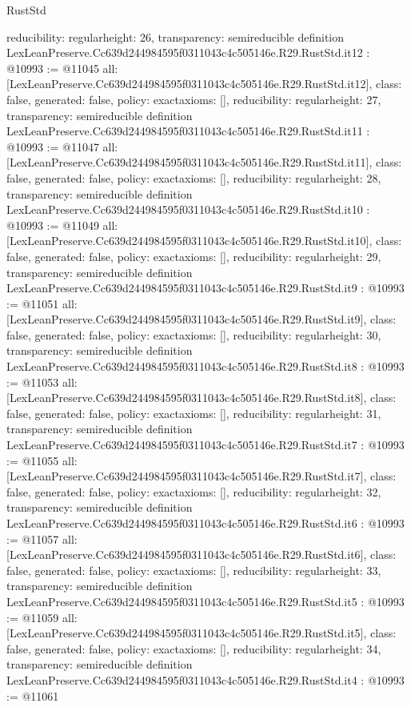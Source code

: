 \begin{lexlean}{RustStd}
\begin{coremodule}
{  reducibility: regular{height: 26},
  transparency: semireducible
}
definition LexLeanPreserve.Cc639d244984595f0311043c4c505146e.R29.RustStd.it12 : @10993 := @11045 {
  all: [LexLeanPreserve.Cc639d244984595f0311043c4c505146e.R29.RustStd.it12],
  class: false,
  generated: false,
  policy: exact{axioms: []},
  reducibility: regular{height: 27},
  transparency: semireducible
}
definition LexLeanPreserve.Cc639d244984595f0311043c4c505146e.R29.RustStd.it11 : @10993 := @11047 {
  all: [LexLeanPreserve.Cc639d244984595f0311043c4c505146e.R29.RustStd.it11],
  class: false,
  generated: false,
  policy: exact{axioms: []},
  reducibility: regular{height: 28},
  transparency: semireducible
}
definition LexLeanPreserve.Cc639d244984595f0311043c4c505146e.R29.RustStd.it10 : @10993 := @11049 {
  all: [LexLeanPreserve.Cc639d244984595f0311043c4c505146e.R29.RustStd.it10],
  class: false,
  generated: false,
  policy: exact{axioms: []},
  reducibility: regular{height: 29},
  transparency: semireducible
}
definition LexLeanPreserve.Cc639d244984595f0311043c4c505146e.R29.RustStd.it9 : @10993 := @11051 {
  all: [LexLeanPreserve.Cc639d244984595f0311043c4c505146e.R29.RustStd.it9],
  class: false,
  generated: false,
  policy: exact{axioms: []},
  reducibility: regular{height: 30},
  transparency: semireducible
}
definition LexLeanPreserve.Cc639d244984595f0311043c4c505146e.R29.RustStd.it8 : @10993 := @11053 {
  all: [LexLeanPreserve.Cc639d244984595f0311043c4c505146e.R29.RustStd.it8],
  class: false,
  generated: false,
  policy: exact{axioms: []},
  reducibility: regular{height: 31},
  transparency: semireducible
}
definition LexLeanPreserve.Cc639d244984595f0311043c4c505146e.R29.RustStd.it7 : @10993 := @11055 {
  all: [LexLeanPreserve.Cc639d244984595f0311043c4c505146e.R29.RustStd.it7],
  class: false,
  generated: false,
  policy: exact{axioms: []},
  reducibility: regular{height: 32},
  transparency: semireducible
}
definition LexLeanPreserve.Cc639d244984595f0311043c4c505146e.R29.RustStd.it6 : @10993 := @11057 {
  all: [LexLeanPreserve.Cc639d244984595f0311043c4c505146e.R29.RustStd.it6],
  class: false,
  generated: false,
  policy: exact{axioms: []},
  reducibility: regular{height: 33},
  transparency: semireducible
}
definition LexLeanPreserve.Cc639d244984595f0311043c4c505146e.R29.RustStd.it5 : @10993 := @11059 {
  all: [LexLeanPreserve.Cc639d244984595f0311043c4c505146e.R29.RustStd.it5],
  class: false,
  generated: false,
  policy: exact{axioms: []},
  reducibility: regular{height: 34},
  transparency: semireducible
}
definition LexLeanPreserve.Cc639d244984595f0311043c4c505146e.R29.RustStd.it4 : @10993 := @11061 {
}
\end{coremodule}
\end{lexlean}
